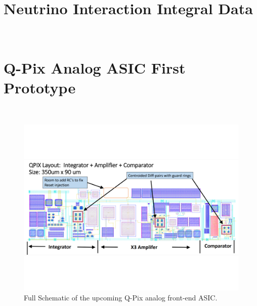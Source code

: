 \documentclass[12pt]{uh_thesis}
\begin{document}
\chapter{Neutrino Interaction Integral Data}~\label{app:integral_data}


\chapter{Q-Pix Analog ASIC First Prototype}~\label{app:analog_prototype}
\begin{figure}[]
\centering
\includegraphics[width=\textwidth]{images/upcoming_qpix_ASIC.pdf}
\caption{Full Schematic of the upcoming Q-Pix analog front-end ASIC.}
\end{figure}

\printindex
\end{document}
